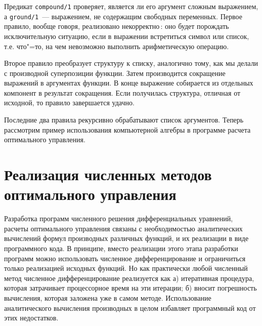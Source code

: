 \documentclass[a4paper,14pt, openany, twoside, draft]{extbook} %
\begin{document}
Предикат \texttt{compound/1} проверяет, является ли его аргумент сложным выражением, а \texttt{ground/1}~--- выражением, не содержащим свободных переменных.  Первое правило, вообще говоря, реализовано некорректно\,: оно будет порождать исключительную ситуацию, если в выражении встретиться символ или список, т.е. что"=то, на чем невозможно выполнить арифметическую операцию.

Второе правило преобразует структуру к списку, аналогично тому, как мы делали с производной суперпозиции функции.  Затем производится сокращение выражений в аргументах функции.  В конце выражение собирается из отдельных компонент в результат сокращения.  Если получилась структура, отличная от исходной, то правило завершается удачно.

Последние два правила рекурсивно обрабатывают список аргументов.  Теперь рассмотрим пример использования компьютерной алгебры в программе расчета оптимального управления.

\section{Реализация численных методов оптимального управления}
\label{sec:optcontr}
\lstset{language=Python}

\newcommand{\vecx}{\mathbfit{x}}
\newcommand{\vecf}{\mathbfit{f}}
\newcommand{\vecg}{\mathbfit{g}}
\newcommand{\vecu}{\mathbfit{u}}
\newcommand{\vecpsi}{\mathbfit{\psi}}
\newcommand{\vecH}{\mathbfit{H}}

Разработка программ численного решения дифференциальных уравнений, расчеты оптимального управления связаны с необходимостью аналитических вычислений формул производных различных функций, и их реализации в виде программного кода.  В принципе, вместо реализации этого этапа разработки программ можно использовать численное дифференцирование и ограничиться только реализацией исходных функций.  Но как практически любой численный метод численное дифференцирование реализуется как а) итеративная процедура, которая затрачивает процессорное время на эти итерации; б) вносит погрешность вычисления, которая заложена уже в самом методе.  Использование аналитического вычисления производных в целом избавляет программный код от этих недостатков.
\end{document}
